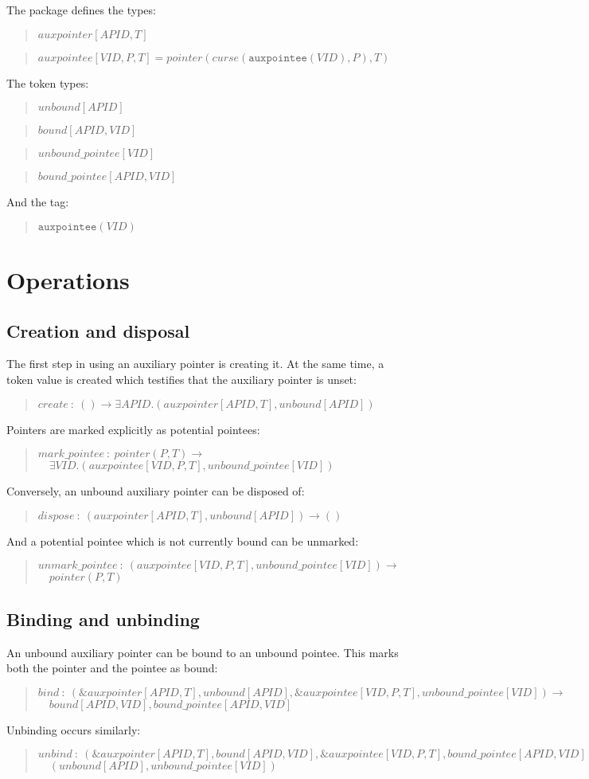 \documentclass[a4paper]{book}
\newcommand\TypeDefinition[1]{\begin{quote}$\mathit{#1}$\end{quote}}
\newcommand\FuncSignature[2]{\begin{quote}$\mathit{#1}\ :\ \mathit{#2}$\end{quote}}
\newcommand\FuncSignatureII[3]{\begin{quote}$\mathit{#1}\ :\ \mathit{#2} \to$\\${}\quad \mathit{#3}$ \end{quote}}
\newcommand\TagDefinitionII[2]{\begin{quote}$\mathtt{#1}(\mathit{#2})$\end{quote}}
\begin{document}
\smallskip
\noindent
The package defines the types:

\TypeDefinition{auxpointer[APID,T]}
\TypeDefinition{auxpointee[VID,P,T] = pointer(curse(\texttt{auxpointee}(VID),P),T)}

\noindent
The token types:

\TypeDefinition{unbound[APID]}
\TypeDefinition{bound[APID,VID]}
\TypeDefinition{unbound\_pointee[VID]}
\TypeDefinition{bound\_pointee[APID,VID]}

\noindent
And the tag:
\TagDefinitionII{auxpointee}{VID}


\section*{Operations}

\subsection*{Creation and disposal}
The first step in using an auxiliary pointer is creating it.
At the same time, a token value is created which testifies that the
auxiliary pointer is unset:
\FuncSignature{create}{() \to \exists APID.(auxpointer[APID,T], unbound[APID])}

\noindent
Pointers are marked explicitly as potential pointees:
\FuncSignatureII{mark\_pointee}
{pointer(P,T)}
{\exists VID.(auxpointee[VID,P,T], unbound\_pointee[VID])
}

\noindent
Conversely, an unbound auxiliary pointer can be disposed of:
\FuncSignature{dispose}{(auxpointer[APID,T], unbound[APID]) \to ()}

\noindent
And a potential pointee which is not currently bound can be unmarked:
\FuncSignatureII{unmark\_pointee}
{(auxpointee[VID,P,T], unbound\_pointee[VID])
}
{pointer(P,T)}

\subsection*{Binding and unbinding}
An unbound auxiliary pointer can be bound to an unbound pointee.
This marks both the pointer and the pointee as bound:

\FuncSignatureII{bind}
{(\&auxpointer[APID,T], unbound[APID], \&auxpointee[VID,P,T], unbound\_pointee[VID])}
{bound[APID,VID], bound\_pointee[APID,VID]}

\noindent
Unbinding occurs similarly:
\FuncSignatureII{unbind}
{(\&auxpointer[APID,T], bound[APID,VID], \&auxpointee[VID,P,T], bound\_pointee[APID,VID])}
{(unbound[APID], unbound\_pointee[VID])}
\end{document}
